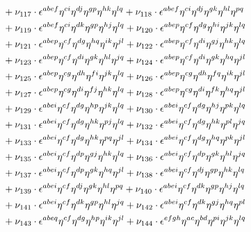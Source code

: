 \documentclass[a4paper,12pt, DIV=14, BCOR=5mm, twoside, headsepline]{scrbook}
\begin{document}
\begin{align}
\begin{alignedat}{2}
& & &\hphantom{=}
+\nu_{117}\cdot\epsilon^{abef}\eta^{ci}\eta^{dj}\eta^{gp}\eta^{hk}\eta^{lq}+\nu_{118}\cdot\epsilon^{abef}\eta^{ci}\eta^{dj}\eta^{gk}\eta^{hl}\eta^{pq}\\
& & &\hphantom{=}
+\nu_{119}\cdot\epsilon^{abef}\eta^{ci}\eta^{dk}\eta^{gp}\eta^{hj}\eta^{lq}+\nu_{120}\cdot\epsilon^{abep}\eta^{cf}\eta^{dg}\eta^{hi}\eta^{jk}\eta^{lq}\\
& & &\hphantom{=}
+\nu_{121}\cdot\epsilon^{abep}\eta^{cf}\eta^{dg}\eta^{hq}\eta^{ik}\eta^{jl}+\nu_{122}\cdot\epsilon^{abep}\eta^{cf}\eta^{di}\eta^{gj}\eta^{hk}\eta^{lq}\\
& & &\hphantom{=}
+\nu_{123}\cdot\epsilon^{abep}\eta^{cf}\eta^{di}\eta^{gk}\eta^{hl}\eta^{jq}+\nu_{124}\cdot\epsilon^{abep}\eta^{cf}\eta^{di}\eta^{gk}\eta^{hq}\eta^{jl}\\
& & &\hphantom{=}
+\nu_{125}\cdot\epsilon^{abep}\eta^{cg}\eta^{dh}\eta^{fi}\eta^{jk}\eta^{lq}+\nu_{126}\cdot\epsilon^{abep}\eta^{cg}\eta^{dh}\eta^{fq}\eta^{ik}\eta^{jl}\\
& & &\hphantom{=}
+\nu_{127}\cdot\epsilon^{abep}\eta^{cg}\eta^{di}\eta^{fj}\eta^{hk}\eta^{lq}+\nu_{128}\cdot\epsilon^{abep}\eta^{cg}\eta^{di}\eta^{fk}\eta^{hq}\eta^{jl}\\
& & &\hphantom{=}
+\nu_{129}\cdot\epsilon^{abei}\eta^{cf}\eta^{dg}\eta^{hp}\eta^{jk}\eta^{lq}+\nu_{130}\cdot\epsilon^{abei}\eta^{cf}\eta^{dg}\eta^{hj}\eta^{pk}\eta^{lq}\\
& & &\hphantom{=}
+\nu_{131}\cdot\epsilon^{abei}\eta^{cf}\eta^{dg}\eta^{hk}\eta^{pj}\eta^{lq}+\nu_{132}\cdot\epsilon^{abei}\eta^{cf}\eta^{dg}\eta^{hk}\eta^{pl}\eta^{jq}\\
& & &\hphantom{=}
+\nu_{133}\cdot\epsilon^{abei}\eta^{cf}\eta^{dg}\eta^{hk}\eta^{pq}\eta^{jl}+\nu_{134}\cdot\epsilon^{abei}\eta^{cf}\eta^{dg}\eta^{hq}\eta^{pk}\eta^{jl}\\
& & &\hphantom{=}
+\nu_{135}\cdot\epsilon^{abei}\eta^{cf}\eta^{dp}\eta^{gj}\eta^{hk}\eta^{lq}+\nu_{136}\cdot\epsilon^{abei}\eta^{cf}\eta^{dp}\eta^{gk}\eta^{hl}\eta^{jq}\\
& & &\hphantom{=}
+\nu_{137}\cdot\epsilon^{abei}\eta^{cf}\eta^{dp}\eta^{gk}\eta^{hq}\eta^{jl}+\nu_{138}\cdot\epsilon^{abei}\eta^{cf}\eta^{dj}\eta^{gp}\eta^{hk}\eta^{lq}\\
& & &\hphantom{=}
+\nu_{139}\cdot\epsilon^{abei}\eta^{cf}\eta^{dj}\eta^{gk}\eta^{hl}\eta^{pq}+\nu_{140}\cdot\epsilon^{abei}\eta^{cf}\eta^{dk}\eta^{gp}\eta^{hj}\eta^{lq}\\
& & &\hphantom{=}
+\nu_{141}\cdot\epsilon^{abei}\eta^{cf}\eta^{dk}\eta^{gp}\eta^{hl}\eta^{jq}+\nu_{142}\cdot\epsilon^{abei}\eta^{cf}\eta^{dk}\eta^{gj}\eta^{hq}\eta^{pl}\\
& & &\hphantom{=}
+\nu_{143}\cdot\epsilon^{abeq}\eta^{cf}\eta^{dg}\eta^{hp}\eta^{ik}\eta^{jl}+\nu_{144}\cdot\epsilon^{efgh}\eta^{ac}\eta^{bd}\eta^{pi}\eta^{jk}\eta^{lq}
\end{alignedat}
\end{align}
\end{document}
